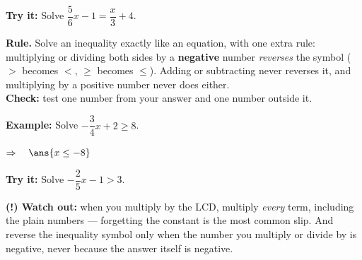 \documentclass[12pt]{article}
\begin{document}
\begin{tryitbox}
\textbf{Try it:} \quad Solve $\dfrac{5}{6}x - 1 = \dfrac{x}{3} + 4$.\\[2pt]
\end{tryitbox}


\begin{formulabox}
\textbf{Rule.} Solve an inequality exactly like an equation, with one extra
rule: multiplying or dividing both sides by a \textbf{negative} number
\emph{reverses} the symbol ($>$ becomes $<$, $\ge$ becomes $\le$). Adding or
subtracting never reverses it, and multiplying by a positive number never
does either.\\[3pt]
\textbf{Check:} test one number from your answer and one number outside it.
\end{formulabox}

\begin{examplebox}
\textbf{Example:} \quad Solve $-\dfrac{3}{4}x + 2 \ge 8$.

$\Rightarrow\quad \ans{x \le -8}$
\end{examplebox}

\begin{tryitbox}
\textbf{Try it:} \quad Solve $-\dfrac{2}{5}x - 1 > 3$.\\[2pt]
\end{tryitbox}

\begin{watchoutbox}
\textbf{(!) Watch out:} when you multiply by the LCD, multiply \emph{every}
term, including the plain numbers --- forgetting the constant is the most
common slip. And reverse the inequality symbol only when the number you
multiply or divide by is negative, never because the answer itself is
negative.
\end{watchoutbox}
\end{document}
